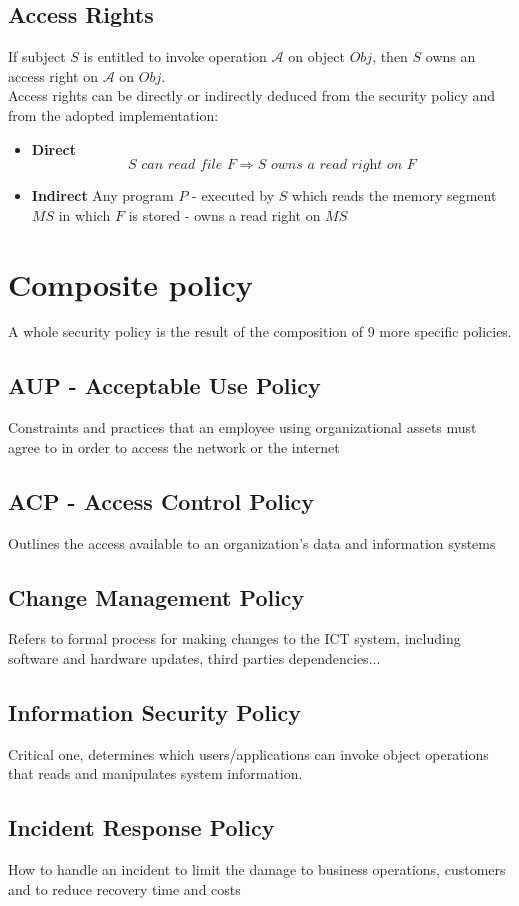 \subsection{Access Rights}
If subject $S$ is entitled to invoke operation $\mathcal{A}$ on object $Obj$, then $S$ owns an access right on $\mathcal{A}$ on $Obj$.\\
Access rights can be directly or indirectly deduced from the security policy and from the adopted implementation:
\begin{itemize}
    \item \textbf{Direct} 
    \[S \textit{ can read file } F \Rightarrow S \textit{ owns a read right on } F\]
    \item \textbf{Indirect}
    Any program $P$ {-} executed by $S$ which reads the memory segment $MS$ in which $F$ is stored {-} owns a read right on $MS$
\end{itemize}

\section{Composite policy}
A whole security policy is the result of the composition of 9 more specific policies.
\subsection{AUP - Acceptable Use Policy}
Constraints and practices that an employee using organizational assets must agree to in order to access the network or the internet
\subsection{ACP - Access Control Policy}
Outlines the access available to an organization’s data and
information systems
\subsection{Change Management Policy}
Refers to formal process for making changes to the ICT system,
including software and hardware updates, third parties dependencies...
\subsection{Information Security Policy}
Critical one, determines which users/applications can invoke object operations that reads and manipulates system information.
\subsection{Incident Response Policy}
How to handle an incident to limit the damage to business operations, customers and to reduce recovery time and costs
